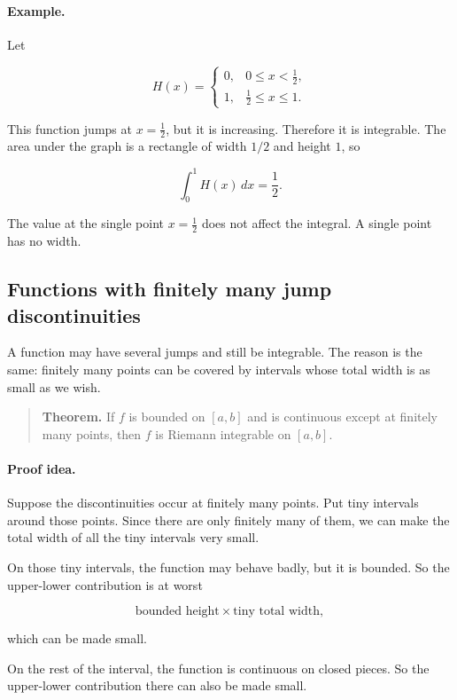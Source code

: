 \paragraph{Example.}
Let

\[
H(x)=
\begin{cases}
0, & 0\le x<\frac12,\\
1, & \frac12\le x\le1.
\end{cases}
\]

This function jumps at \(x=\frac12\), but it is increasing.  Therefore it is integrable.
The area under the graph is a rectangle of width \(1/2\) and height \(1\), so

\[
\int_0^1 H(x)\,dx=\frac12.
\]

The value at the single point \(x=\frac12\) does not affect the integral.  A single point
has no width.

\subsection{Functions with finitely many jump discontinuities}
\label{subsec:finitely-many-jumps-integrable}

A function may have several jumps and still be integrable.  The reason is the same:
finitely many points can be covered by intervals whose total width is as small as we
wish.

\begin{quote}
\textbf{Theorem.}
If \(f\) is bounded on \([a,b]\) and is continuous except at finitely many points, then
\(f\) is Riemann integrable on \([a,b]\).
\end{quote}

\paragraph{Proof idea.}
Suppose the discontinuities occur at finitely many points.  Put tiny intervals around
those points.  Since there are only finitely many of them, we can make the total width
of all the tiny intervals very small.

On those tiny intervals, the function may behave badly, but it is bounded.  So the
upper-lower contribution is at worst

\[
\text{bounded height}\times\text{tiny total width},
\]

which can be made small.

On the rest of the interval, the function is continuous on closed pieces.  So the
upper-lower contribution there can also be made small.

